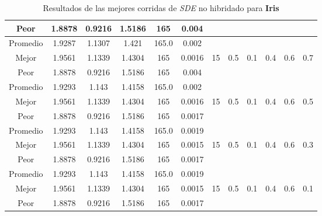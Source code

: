 \begin{table}[h!]
\begin{center}
\begin{tabular}{|c|c|c|c|c|c|c|c|c|c|c|c|}
            \cline{1-6}
            Peor & 1.8878 & 0.9216  & 1.5186 & 165 & 0.004 &  &  &  &  &  & \\
        \hline
        \hline
            Promedio  & 1.9287 & 1.1307 & 1.421 & 165.0 & 0.002 &  &  &  &  &  & \\
            \cline{1-6}
            Mejor & 1.9561 & 1.1339  & 1.4304 & 165 & 0.0016 & 15 & 0.5 & 0.1 & 0.4 & 0.6 & 0.7\\
            \cline{1-6}
            Peor & 1.8878 & 0.9216  & 1.5186 & 165 & 0.004 &  &  &  &  &  & \\
        \hline
        \hline
            Promedio  & 1.9293 & 1.143 & 1.4158 & 165.0 & 0.002 &  &  &  &  &  & \\
            \cline{1-6}
            Mejor & 1.9561 & 1.1339  & 1.4304 & 165 & 0.0016 & 15 & 0.5 & 0.1 & 0.4 & 0.6 & 0.5\\
            \cline{1-6}
            Peor & 1.8878 & 0.9216  & 1.5186 & 165 & 0.0017 &  &  &  &  &  & \\
        \hline
        \hline
            Promedio  & 1.9293 & 1.143 & 1.4158 & 165.0 & 0.0019 &  &  &  &  &  & \\
            \cline{1-6}
            Mejor & 1.9561 & 1.1339  & 1.4304 & 165 & 0.0015 & 15 & 0.5 & 0.1 & 0.4 & 0.6 & 0.3\\
            \cline{1-6}
            Peor & 1.8878 & 0.9216  & 1.5186 & 165 & 0.0017 &  &  &  &  &  & \\
        \hline
        \hline
            Promedio  & 1.9293 & 1.143 & 1.4158 & 165.0 & 0.0019 &  &  &  &  &  & \\
            \cline{1-6}
            Mejor & 1.9561 & 1.1339  & 1.4304 & 165 & 0.0015 & 15 & 0.5 & 0.1 & 0.4 & 0.6 & 0.1\\
            \cline{1-6}
            Peor & 1.8878 & 0.9216  & 1.5186 & 165 & 0.0017 &  &  &  &  &  & \\
        \hline
        \end{tabular}
        \caption{Resultados de las mejores corridas de \emph{SDE} no hibridado para {\bf Iris}}
        \label{tb:tablesdealgcsv}
    \end{center}
\end{table}



